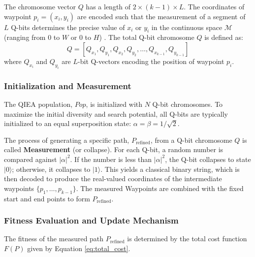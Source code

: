 The chromosome vector $Q$ has a length of $2 \times (k-1) \times L$. The coordinates of waypoint $p_i = (x_i, y_i)$ are encoded such that the measurement of a segment of $L$ Q-bits determines the precise value of $x_i$ or $y_i$ in the continuous space $\mathcal{M}$ (ranging from 0 to $W$ or 0 to $H$) \cite{ref15}. The total Q-bit chromosome $Q$ is defined as:
\begin{equation}
    Q = [Q_{x_1}, Q_{y_1}, Q_{x_2}, Q_{y_2}, \ldots, Q_{x_{k-1}}, Q_{y_{k-1}}]
\end{equation}
where $Q_{x_i}$ and $Q_{y_i}$ are $L$-bit Q-vectors encoding the position of waypoint $p_i$.


\subsubsection{Initialization and Measurement}
The QIEA population, $Pop$, is initialized with $N$ Q-bit chromosomes. To maximize the initial diversity and search potential, all Q-bits are typically initialized to an equal superposition state: $\alpha = \beta = 1/\sqrt{2}$.

The process of generating a specific path, $P_{\text{refined}}$, from a Q-bit chromosome $Q$ is called \textbf{Measurement} (or collapse). For each Q-bit, a random number is compared against $|\alpha|^2$. If the number is less than $|\alpha|^2$, the Q-bit collapses to state $|0\rangle$; otherwise, it collapses to $|1\rangle$. This yields a classical binary string, which is then decoded to produce the real-valued coordinates of the intermediate waypoints $\{p_1, \ldots, p_{k-1}\}$. The measured Waypoints are combined with the fixed start and end points to form $P_{\text{refined}}$.


\subsubsection{Fitness Evaluation and Update Mechanism}
The fitness of the measured path $P_{\text{refined}}$ is determined by the total cost function $F(P)$ given by Equation \eqref{eq:total_cost}.

